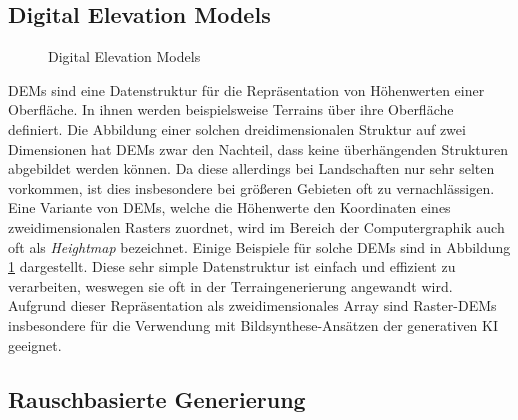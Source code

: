 \subsection{Digital Elevation Models}

\begin{figure}[htbp]
    \centering
    \caption{Digital Elevation Models \cite{nasa2013srtm}}
    \label{fig:DEMs}
\end{figure}
\ac{DEM}s sind eine Datenstruktur für die Repräsentation von Höhenwerten einer Oberfläche. In ihnen werden beispielsweise Terrains über ihre Oberfläche definiert. Die Abbildung einer solchen dreidimensionalen Struktur auf zwei Dimensionen hat \ac{DEM}s zwar den Nachteil, dass keine überhängenden Strukturen abgebildet werden können. Da diese allerdings bei Landschaften nur sehr selten vorkommen, ist dies insbesondere bei größeren Gebieten oft zu vernachlässigen.\\
Eine Variante von \ac{DEM}s, welche die Höhenwerte den Koordinaten eines zweidimensionalen Rasters zuordnet, wird im Bereich der Computergraphik auch oft als \textit{Heightmap} bezeichnet. Einige Beispiele für solche \ac{DEM}s sind in Abbildung \ref{fig:DEMs} dargestellt. Diese sehr simple Datenstruktur ist einfach und effizient zu verarbeiten, weswegen sie oft in der Terraingenerierung angewandt wird. Aufgrund dieser Repräsentation als zweidimensionales Array sind Raster-\ac{DEM}s insbesondere für die Verwendung mit Bildsynthese-Ansätzen der generativen \ac{KI} geeignet.

\subsection{Rauschbasierte Generierung}

